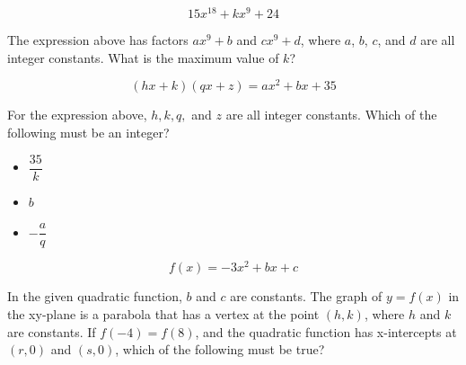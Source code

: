 \vspace{0.75em}


\vspace{3em}

\newpage

\noindent\markforreview
\vspace{1em}

\vspace{1em}

\[
15x^{18} + kx^{9} + 24
\]

The expression above has factors $ax^{9}+b$ and $cx^{9}+d$, where $a$, $b$, $c$, and $d$ are all integer constants.  
What is the maximum value of $k$?


\newpage

\vspace{2em}

\noindent\markforreview
\vspace{1em}

\vspace{1em}

\[
(hx+k)(qx+z) = ax^{2} + bx + 35
\]

For the expression above, $h, k, q,$ and $z$ are all integer constants.  
Which of the following must be an integer?

\begin{itemize}
\item[I.] $\dfrac{35}{k}$
\item[II.] $b$
\item[III.] $-\dfrac{a}{q}$
\end{itemize}

\vspace{0.75em}


\newpage

\newpage

\noindent\markforreview
\vspace{1em}

\vspace{1em}

\[
f(x)=-3x^{2}+bx+c
\]

In the given quadratic function, $b$ and $c$ are constants. The graph of $y=f(x)$ in the xy-plane is a parabola that has a vertex at the point $(h,k)$, where $h$ and $k$ are constants. If $f(-4)=f(8)$, and the quadratic function has x-intercepts at $(r,0)$ and $(s,0)$, which of the following must be true?

